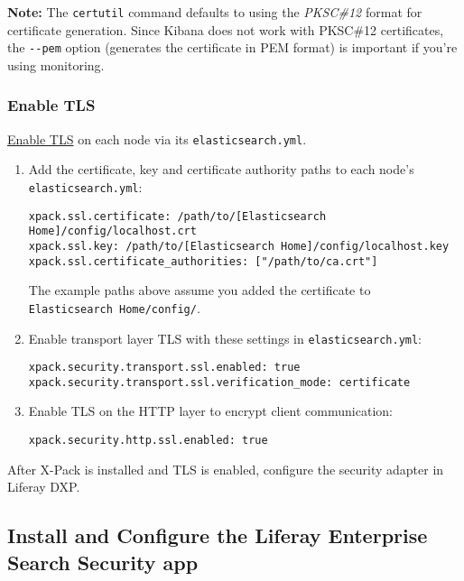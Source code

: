 \noindent\hrulefill

\textbf{Note:} The \texttt{certutil} command defaults to using the
\emph{PKSC\#12} format for certificate generation. Since Kibana does not
work with PKSC\#12 certificates, the \texttt{-\/-pem} option (generates
the certificate in PEM format) is important if you're using monitoring.

\noindent\hrulefill

\subsubsection{Enable TLS}\label{enable-tls}

\href{https://www.elastic.co/guide/en/elasticsearch/reference/6.1/configuring-tls.html\#enable-ssl}{Enable
TLS} on each node via its \texttt{elasticsearch.yml}.

\begin{enumerate}
\def\labelenumi{\arabic{enumi}.}
\item
  Add the certificate, key and certificate authority paths to each
  node's \texttt{elasticsearch.yml}:

\begin{verbatim}
xpack.ssl.certificate: /path/to/[Elasticsearch Home]/config/localhost.crt
xpack.ssl.key: /path/to/[Elasticsearch Home]/config/localhost.key
xpack.ssl.certificate_authorities: ["/path/to/ca.crt"]
\end{verbatim}

  The example paths above assume you added the certificate to
  \texttt{Elasticsearch\ Home/config/}.
\item
  Enable transport layer TLS with these settings in
  \texttt{elasticsearch.yml}:

\begin{verbatim}
xpack.security.transport.ssl.enabled: true
xpack.security.transport.ssl.verification_mode: certificate
\end{verbatim}
\item
  Enable TLS on the HTTP layer to encrypt client communication:

\begin{verbatim}
xpack.security.http.ssl.enabled: true
\end{verbatim}
\end{enumerate}

After X-Pack is installed and TLS is enabled, configure the security
adapter in Liferay DXP.

\subsection{Install and Configure the Liferay Enterprise Search Security
app}\label{install-and-configure-the-liferay-enterprise-search-security-app}

